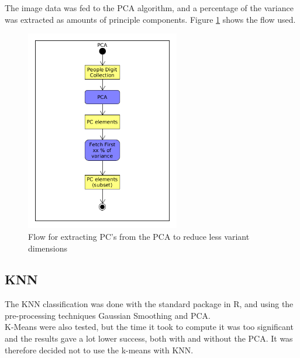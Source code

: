 \documentclass[report]{subfiles}
\begin{document}
The image data was fed to the PCA algorithm, and a percentage of the variance was extracted as amounts of principle components. Figure \ref{fig:pca} shows the flow used.

\begin{figure}[H]
  \centering
  \includegraphics[width=0.6\textwidth]{UML/PCA}
  \caption{Flow for extracting PC's from the PCA to reduce less variant dimensions}
  \label{fig:pca}
\end{figure}

\subsection{KNN}
\label{sec:impKNN}

The KNN classification was done with the standard package in R, and using the pre-processing techniques Gaussian Smoothing and PCA.\\
K-Means were also tested, but the time it took to compute it was too significant and the results gave a lot lower success, both with and without the PCA. It was therefore decided not to use the k-means with KNN.
\end{document}
